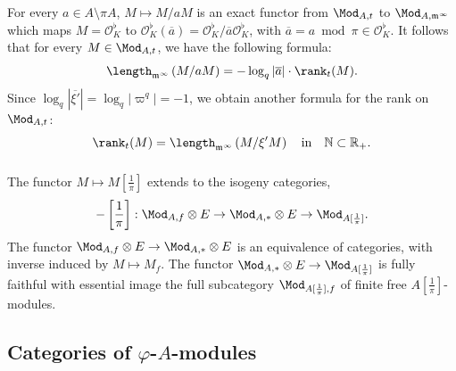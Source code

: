 \subsubsection{}\label{subsec:relatinglength2rank}

For every $a\in A\setminus\pi A$, $M\mapsto M/aM$ is an exact functor from $\Mod_{A,t}$ to $\Mod_{A,\mathfrak{m}^{\infty}}$ which maps $M=\mathcal{O}_{K}^{\flat}$ to $\mathcal{O}_{K}^{\flat}(\overline{a})=\mathcal{O}_{K}^{\flat}/\overline{a}\mathcal{O}_{K}^{\flat}$, with $\overline{a}=a\bmod\pi\in\mathcal{O}_{K}^{\flat}$. It follows that for every $M\in\Mod_{A,t}$, we have the following formula:
\[
\length_{\mathfrak{m}^{\infty}}\left(M/aM\right)=-\log_{q}\left|\overline{a}\right|\cdot\rank_{t}(M).
\]
Since $\log_{q}\left|\overline{\xi'}\right|=\log_{q}\left|\varpi^{q}\right|=-1$, we obtain another formula for the rank on $\Mod_{A,t}$:
\[
\rank_{t}(M)=\length_{\mathfrak{m}^{\infty}}\left(M/\xi'M\right)\quad\text{in}\quad\mathbb{N}\subset\mathbb{R}_{+}.
\]

\subsubsection{}

The functor $M\mapsto M[\frac{1}{\pi}]$ extends to the isogeny categories,
\[
-\left[\frac{1}{\pi}\right]:\Mod_{A,f}\otimes E\rightarrow\Mod_{A,\ast}\otimes E\rightarrow\Mod_{A[\frac{1}{\pi}]}.
\]
The functor $\Mod_{A,f}\otimes E\rightarrow\Mod_{A,\ast}\otimes E$ is an equivalence of categories, with inverse induced by $M\mapsto M_{f}$. The functor $\Mod_{A,\ast}\otimes E\rightarrow\Mod_{A[\frac{1}{\pi}]}$ is fully faithful with essential image the full subcategory $\Mod_{A[\frac{1}{\pi}],f}$ of finite free $A[\frac{1}{\pi}]$-modules.

\subsection{Categories of \texorpdfstring{$\varphi$}{phi}-\texorpdfstring{$A$}{A}-modules}

\subsubsection{}

